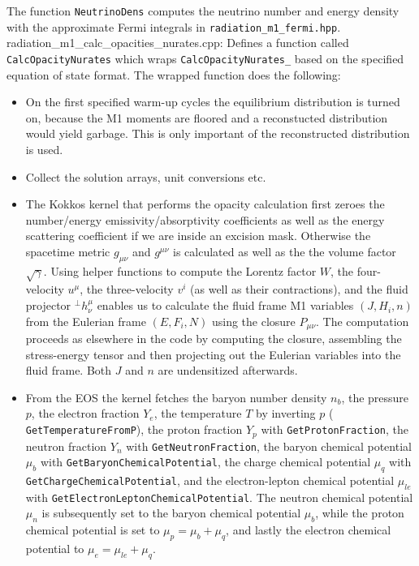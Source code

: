 \documentclass{article}
\newcommand{\var}[1]{%
  {\setlength{\fboxsep}{1.5pt}%
   \colorbox{varbg}{\textcolor{varfg}{\texttt{\small #1}}}}}
\begin{document}
The function \var{NeutrinoDens} computes the neutrino number and energy density with the approximate Fermi integrals in \var{radiation\_m1\_fermi.hpp}.\\
{\color{gray}radiation\_m1\_calc\_opacities\_nurates.cpp:} Defines a function called \var{CalcOpacityNurates} which wraps \var{CalcOpacityNurates\_} based on the specified equation of state
format. The wrapped function does the following:
\begin{itemize}
  \item On the first specified warm-up cycles the equilibrium distribution is turned on, because the M1 moments are floored and a reconstucted distribution would yield
  garbage. This is only important of the reconstructed distribution is used.
  \item Collect the solution arrays, unit conversions etc.
  \item The Kokkos kernel that performs the opacity calculation first zeroes the number/energy emissivity/absorptivity coefficients as well as the energy scattering coefficient if we
  are inside an excision mask. Otherwise the spacetime metric $g_{\mu\nu}$ and $g^{\mu\nu}$ is calculated as well as the the volume factor $\sqrt{\gamma}$. Using helper functions to
  compute the Lorentz factor $W$, the four-velocity $u^{\mu}$, the three-velocity $v^i$ (as well as their contractions), and the fluid projector $^{\perp}h^{\mu}_{\nu}$ enables us to
  calculate the fluid frame M1 variables $(J,H_{i},n)$ from the Eulerian frame $(E,F_i,N)$ using the closure $P_{\mu\nu}$. The computation proceeds as elsewhere in the code by computing the closure, assembling
  the stress-energy tensor and then projecting out the Eulerian variables into the fluid frame. Both $J$ and $n$ are undensitized afterwards.
  \item From the EOS the kernel fetches the baryon number density $n_b$, the pressure $p$, the electron fraction $Y_e$, the temperature $T$ by inverting $p$ (\var{GetTemperatureFromP}),
  the proton fraction $Y_p$ with \var{GetProtonFraction}, the neutron fraction $Y_n$ with \var{GetNeutronFraction}, the baryon chemical potential $\mu_b$ with \var{GetBaryonChemicalPotential},
  the charge chemical potential $\mu_q$ with \var{GetChargeChemicalPotential}, and the electron-lepton chemical potential $\mu_{le}$ with \var{GetElectronLeptonChemicalPotential}. The neutron chemical potential $\mu_n$ is
  subsequently set to the baryon chemical potential $\mu_b$, while the proton chemical potential is set to $\mu_p=\mu_b+\mu_q$, and lastly the electron chemical potential to $\mu_e=\mu_{le}+\mu_q$.

\end{itemize}
\end{document}
